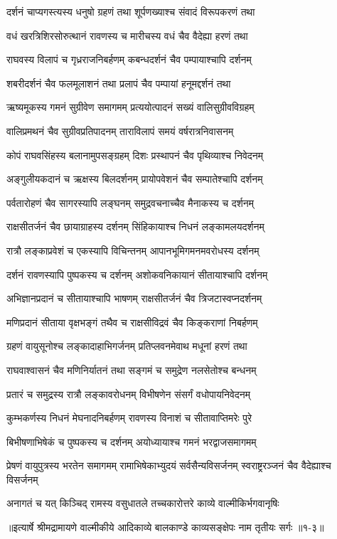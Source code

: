 \twolineshloka
{दर्शनं चाप्यगस्त्यस्य धनुषो ग्रहणं तथा}
{शूर्पणख्याश्च संवादं विरूपकरणं तथा} %

\twolineshloka
{वधं खरत्रिशिरसोरुत्थानं रावणस्य च}
{मारीचस्य वधं चैव वैदेह्या हरणं तथा} %

\twolineshloka
{राघवस्य विलापं च गृध्रराजनिबर्हणम्}
{कबन्धदर्शनं चैव पम्पायाश्चापि दर्शनम्} %

\twolineshloka
{शबरीदर्शनं चैव फलमूलाशनं तथा}
{प्रलापं चैव पम्पायां हनूमद्दर्शनं तथा} %

\twolineshloka
{ऋष्यमूकस्य गमनं सुग्रीवेण समागमम्}
{प्रत्ययोत्पादनं सख्यं वालिसुग्रीवविग्रहम्} %

\twolineshloka
{वालिप्रमथनं चैव सुग्रीवप्रतिपादनम्}
{ताराविलापं समयं वर्षरात्रनिवासनम्} %

\twolineshloka
{कोपं राघवसिंहस्य बलानामुपसङ्ग्रहम्}
{दिशः प्रस्थापनं चैव पृथिव्याश्च निवेदनम्} %

\twolineshloka
{अङ्गुलीयकदानं च ऋक्षस्य बिलदर्शनम्}
{प्रायोपवेशनं चैव सम्पातेश्चापि दर्शनम्} %

\twolineshloka
{पर्वतारोहणं चैव सागरस्यापि लङ्घनम्}
{समुद्रवचनाच्चैव मैनाकस्य च दर्शनम्} %

\twolineshloka
{राक्षसीतर्जनं चैव छायाग्राहस्य दर्शनम्}
{सिंहिकायाश्च निधनं लङ्कामलयदर्शनम्} %

\twolineshloka
{रात्रौ लङ्काप्रवेशं च एकस्यापि विचिन्तनम्}
{आपानभूमिगमनमवरोधस्य दर्शनम्} %

\twolineshloka
{दर्शनं रावणस्यापि पुष्पकस्य च दर्शनम्}
{अशोकवनिकायानं सीतायाश्चापि दर्शनम्} %

\twolineshloka
{अभिज्ञानप्रदानं च सीतायाश्चापि भाषणम्}
{राक्षसीतर्जनं चैव त्रिजटास्वप्नदर्शनम्} %

\twolineshloka
{मणिप्रदानं सीताया वृक्षभङ्गं तथैव च}
{राक्षसीविद्रवं चैव किङ्कराणां निबर्हणम्} %

\twolineshloka
{ग्रहणं वायुसूनोश्च लङ्कादाहाभिगर्जनम्}
{प्रतिप्लवनमेवाथ मधूनां हरणं तथा} %

\twolineshloka
{राघवाश्वासनं चैव मणिनिर्यातनं तथा}
{सङ्गमं च समुद्रेण नलसेतोश्च बन्धनम्} %

\twolineshloka
{प्रतारं च समुद्रस्य रात्रौ लङ्कावरोधनम्}
{विभीषणेन संसर्गं वधोपायनिवेदनम्} %

\twolineshloka
{कुम्भकर्णस्य निधनं मेघनादनिबर्हणम्}
{रावणस्य विनाशं च सीतावाप्तिमरेः पुरे} %

\twolineshloka
{बिभीषणाभिषेकं च पुष्पकस्य च दर्शनम्}
{अयोध्यायाश्च गमनं भरद्वाजसमागमम्} %

\threelineshloka
{प्रेषणं वायुपुत्रस्य भरतेन समागमम्}
{रामाभिषेकाभ्युदयं सर्वसैन्यविसर्जनम्}
{स्वराष्ट्ररञ्जनं चैव वैदेह्याश्च विसर्जनम्} %

\twolineshloka
{अनागतं च यत् किञ्चिद् रामस्य वसुधातले}
{तच्चकारोत्तरे काव्ये वाल्मीकिर्भगवानृषिः} %


॥इत्यार्षे श्रीमद्रामायणे वाल्मीकीये आदिकाव्ये बालकाण्डे काव्यसङ्क्षेपः नाम तृतीयः सर्गः ॥१-३॥
